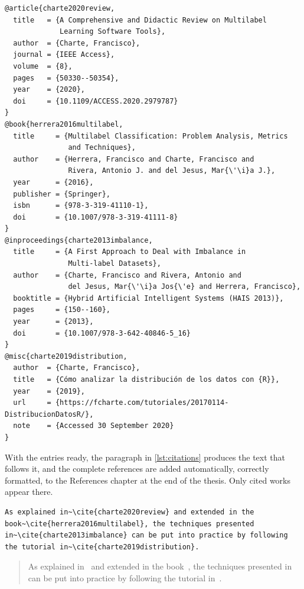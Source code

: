 \begin{lstlisting}[language={[LaTeX]TeX}, caption={BibTeX entries of different types.}, label=lst:bibtex]
@article{charte2020review,
  title   = {A Comprehensive and Didactic Review on Multilabel
             Learning Software Tools},
  author  = {Charte, Francisco},
  journal = {IEEE Access},
  volume  = {8},
  pages   = {50330--50354},
  year    = {2020},
  doi     = {10.1109/ACCESS.2020.2979787}
}
@book{herrera2016multilabel,
  title     = {Multilabel Classification: Problem Analysis, Metrics
               and Techniques},
  author    = {Herrera, Francisco and Charte, Francisco and
               Rivera, Antonio J. and del Jesus, Mar{\'\i}a J.},
  year      = {2016},
  publisher = {Springer},
  isbn      = {978-3-319-41110-1},
  doi       = {10.1007/978-3-319-41111-8}
}
@inproceedings{charte2013imbalance,
  title     = {A First Approach to Deal with Imbalance in
               Multi-label Datasets},
  author    = {Charte, Francisco and Rivera, Antonio and
               del Jesus, Mar{\'\i}a Jos{\'e} and Herrera, Francisco},
  booktitle = {Hybrid Artificial Intelligent Systems (HAIS 2013)},
  pages     = {150--160},
  year      = {2013},
  doi       = {10.1007/978-3-642-40846-5_16}
}
@misc{charte2019distribution,
  author  = {Charte, Francisco},
  title   = {Cómo analizar la distribución de los datos con {R}},
  year    = {2019},
  url     = {https://fcharte.com/tutoriales/20170114-DistribucionDatosR/},
  note    = {Accessed 30 September 2020}
}
\end{lstlisting}

With the entries ready, the paragraph in \autoref{lst:citations} produces the text that
follows it, and the complete references are added automatically, correctly formatted, to
the References chapter at the end of the thesis. Only cited works appear there.

\begin{lstlisting}[language={[LaTeX]TeX}, caption={A paragraph citing several works.}, label=lst:citations]
As explained in~\cite{charte2020review} and extended in the
book~\cite{herrera2016multilabel}, the techniques presented
in~\cite{charte2013imbalance} can be put into practice by following
the tutorial in~\cite{charte2019distribution}.
\end{lstlisting}

\begin{quotation}
  As explained in~\cite{charte2020review} and extended in the
  book~\cite{herrera2016multilabel}, the techniques presented in~\cite{charte2013imbalance}
  can be put into practice by following the tutorial in~\cite{charte2019distribution}.
\end{quotation}

